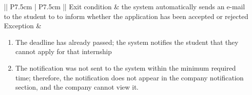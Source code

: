 \begin{table} [H]
\begin{tabular}{|| P{7.5cm} | P{7.5cm} ||}
						Exit condition & the system automatically sends an e-mail to 
						the student to to inform whether the 
						application has been accepted or rejected  \\
						\hline
						Exception & \parbox{5cm}{\begin{enumerate}[label=\alpha]
								\item The deadline has already passed; the 
								system notifies the student that they 
								cannot apply for that internship
								\item The notification was not sent to the system within the minimum required time; therefore, the notification does not appear in the company notification section, and the company cannot view it. \\
								\end{enumerate}} \\
						\hline
					\end{tabular}
				\end{table}
				
				
			
